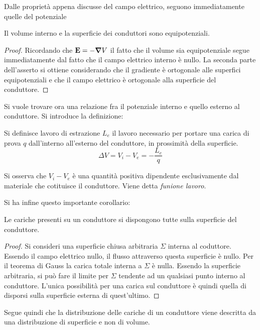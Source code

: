 Dalle proprietà appena discusse del campo elettrico, seguono immediatamente quelle del potenziale
\begin{cor}
    Il volume interno e la superficie dei conduttori sono equipotenziali.
\end{cor}
\begin{proof}
    Ricordando che $\vb{E}=-\grad{V}$ il fatto che il volume sia equipotenziale segue immediatamente dal fatto che
    il campo elettrico interno è nullo.
    La seconda parte dell'asserto si ottiene considerando che il gradiente è ortogonale alle superfici equipotenziali
    e che il campo elettrico è ortogonale alla superficie del conduttore.
\end{proof}

Si vuole trovare ora una relazione fra il potenziale interno e quello esterno al conduttore. Si introduce la definizione:
\begin{defn}
    Si definisce lavoro di estrazione $L_e$ il lavoro necessario per portare una carica di prova $q$ dall'interno
    all'esterno del conduttore, in prossimità della superficie.
    \begin{equation}
        \Delta V=V_i-V_e=-\frac{L_e}{q}
    \end{equation}
\end{defn}

\begin{obses}
    Si osserva che $V_i-V_e$ è una quantità positiva dipendente esclusivamente dal materiale che cotituisce il conduttore.
    Viene detta \textit{funione lavoro}.
\end{obses}

Si ha infine questo importante corollario:
\begin{cor}
    Le cariche presenti su un conduttore si dispongono tutte sulla superficie del conduttore.
\end{cor}
\begin{proof}
    Si consideri una superficie chiusa arbitraria $\Sigma$ interna al coduttore. Essendo il campo elettrico nullo,
    il flusso attraverso questa superficie è nullo. Per il teorema di Gauss la carica totale interna a $\Sigma$ è nulla.
    Essendo la superficie arbitraria, si può fare il limite per $\Sigma$ tendente ad un qualsiasi punto interno al conduttore.
    L'unica possibilità per una carica sul conduttore è quindi quella di disporsi sulla superficie esterna di quest'ultimo.
\end{proof}
Segue quindi che la distribuzione delle cariche di un conduttore viene descritta da una distribuzione di superficie e non di volume.

